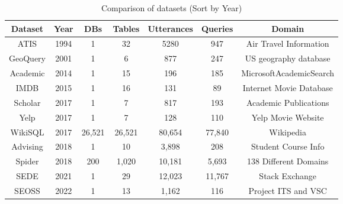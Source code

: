\begin{table}[!ht]
    \centering
    \begin{tabular}{|c|c|c|c|c|c|c|}
        \hline
        \textbf{Dataset} & \textbf{Year} & \textbf{DBs} & \textbf{Tables} & \textbf{Utterances} & \textbf{Queries} & \textbf{Domain}            \\ \hline
        ATIS             & 1994          & 1            & 32              & 5280                & 947              & Air Travel Information     \\ \hline
        GeoQuery         & 2001          & 1            & 6               & 877                 & 247              & US geography database      \\ \hline
        Academic         & 2014          & 1            & 15              & 196                 & 185              & MicrosoftAcademicSearch  \\ \hline
        IMDB             & 2015          & 1            & 16              & 131                 & 89               & Internet Movie Database    \\ \hline
        Scholar          & 2017          & 1            & 7               & 817                 & 193              & Academic Publications      \\ \hline
        Yelp             & 2017          & 1            & 7               & 128                 & 110              & Yelp Movie Website         \\ \hline
        WikiSQL          & 2017          & 26,521       & 26,521          & 80,654              & 77,840           & Wikipedia                  \\ \hline
        Advising         & 2018          & 1            & 10              & 3,898               & 208              & Student Course Info \\ \hline
        Spider           & 2018          & 200          & 1,020           & 10,181              & 5,693            & 138 Different Domains      \\ \hline
        SEDE             & 2021          & 1            & 29              & 12,023              & 11,767           & Stack Exchange             \\ \hline
        SEOSS            & 2022          & 1            & 13              & 1,162               & 116              & Project ITS and VSC        \\ \hline
    \end{tabular}
    \caption{Comparison of datasets (Sort by Year)}
    \label{tab:datasets}
\end{table}